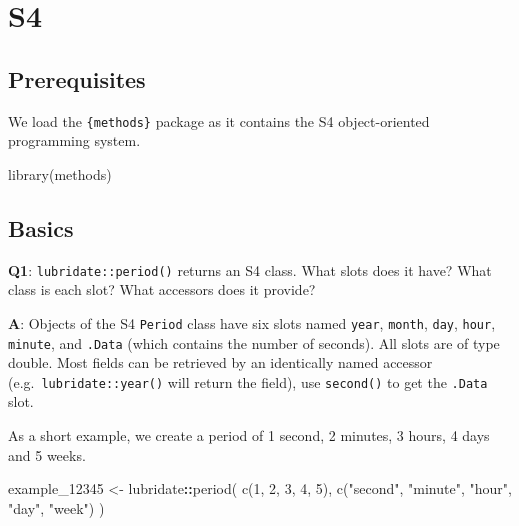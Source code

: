 \documentclass[
]{krantz}
\makeatletter
\newenvironment{Shaded}{\begin{snugshade}}{\end{snugshade}}
\newcommand{\DecValTok}[1]{\textcolor[rgb]{0.00,0.00,0.81}{#1}}
\newcommand{\KeywordTok}[1]{\textcolor[rgb]{0.13,0.29,0.53}{\textbf{#1}}}
\newcommand{\NormalTok}[1]{#1}
\newcommand{\OperatorTok}[1]{\textcolor[rgb]{0.81,0.36,0.00}{\textbf{#1}}}
\newcommand{\StringTok}[1]{\textcolor[rgb]{0.31,0.60,0.02}{#1}}
\newenvironment{kframe}{%
\medskip{}
\setlength{\fboxsep}{.8em}
 \def\at@end@of@kframe{}%
 \ifinner\ifhmode%
  \def\at@end@of@kframe{\end{minipage}}%
  \begin{minipage}{\columnwidth}%
 \fi\fi%
 \def\FrameCommand##1{\hskip\@totalleftmargin \hskip-\fboxsep
 \colorbox{shadecolor}{##1}\hskip-\fboxsep
     \hskip-\linewidth \hskip-\@totalleftmargin \hskip\columnwidth}%
 \MakeFramed {\advance\hsize-\width
   \@totalleftmargin\z@ \linewidth\hsize
   \@setminipage}}%
 {\par\unskip\endMakeFramed%
 \at@end@of@kframe}
\renewenvironment{Shaded}{\begin{kframe}}{\end{kframe}}
\renewcommand{\KeywordTok} [1]{\textcolor[rgb]{0.00,0.44,0.13}{{#1}}}
\renewcommand{\DecValTok}  [1]{\textcolor[rgb]{0.25,0.63,0.44}{{#1}}}
\renewcommand{\StringTok}  [1]{\textcolor[rgb]{0.25,0.44,0.63}{{#1}}}
\renewcommand{\NormalTok}  [1]{{#1}}
\makeatother
\begin{document}
\hypertarget{s4}{%
\chapter{S4}\label{s4}}

\hypertarget{prerequisites-8}{%
\section*{Prerequisites}\label{prerequisites-8}}


We load the \texttt{\{methods\}} package as it contains the S4 object-oriented programming system.

\begin{Shaded}
\begin{Highlighting}[]
\KeywordTok{library}\NormalTok{(methods)}
\end{Highlighting}
\end{Shaded}


\hypertarget{basics-1}{%
\section{Basics}\label{basics-1}}

\textbf{{Q1}}: \texttt{lubridate::period()} returns an S4 class. What slots does it have? What class is each slot? What accessors does it provide?

\textbf{{A}}: Objects of the S4 \texttt{Period} class have six slots named \texttt{year}, \texttt{month}, \texttt{day}, \texttt{hour}, \texttt{minute}, and \texttt{.Data} (which contains the number of seconds). All slots are of type double. Most fields can be retrieved by an identically named accessor (e.g.~\texttt{lubridate::year()} will return the field), use \texttt{second()} to get the \texttt{.Data} slot.

As a short example, we create a period of 1 second, 2 minutes, 3 hours, 4 days and 5 weeks.

\begin{Shaded}
\begin{Highlighting}[]
\NormalTok{example_}\DecValTok{12345}\NormalTok{ <-}\StringTok{ }\NormalTok{lubridate}\OperatorTok{::}\KeywordTok{period}\NormalTok{(}
  \KeywordTok{c}\NormalTok{(}\DecValTok{1}\NormalTok{, }\DecValTok{2}\NormalTok{, }\DecValTok{3}\NormalTok{, }\DecValTok{4}\NormalTok{, }\DecValTok{5}\NormalTok{), }
  \KeywordTok{c}\NormalTok{(}\StringTok{"second"}\NormalTok{, }\StringTok{"minute"}\NormalTok{, }\StringTok{"hour"}\NormalTok{, }\StringTok{"day"}\NormalTok{, }\StringTok{"week"}\NormalTok{)}
\NormalTok{)}
\end{Highlighting}
\end{Shaded}
\end{document}

